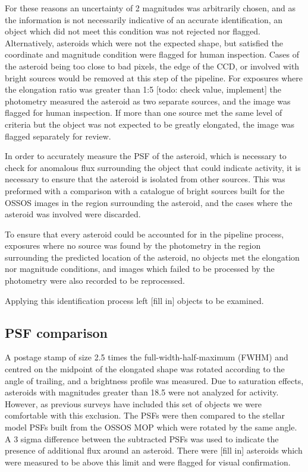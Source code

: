 \documentclass[iop,apj]{emulateapj}
\begin{document}
For these reasons an uncertainty of 2 magnitudes was arbitrarily chosen, and as the information is not necessarily indicative of an accurate identification, an object which did not meet this condition was not rejected nor flagged. Alternatively, asteroids which were not the expected shape, but satisfied the coordinate and magnitude condition were flagged for human inspection. 
Cases of the asteroid being too close to bad pixels, the edge of the CCD, or involved with bright sources would be removed at this step of the pipeline. For exposures where the elongation ratio was greater than 1:5 [todo: check value, implement] the photometry measured the asteroid as two separate sources, and the image was flagged for human inspection. If more than one source met the same level of criteria but the object was not expected to be greatly elongated, the image was flagged separately for review.

In order to accurately measure the PSF of the asteroid, which is necessary to check for anomalous flux surrounding the object that could indicate activity, it is necessary to ensure that the asteroid is isolated from other sources. This was preformed with a comparison with a catalogue of bright sources built for the OSSOS images \citep{ossos} in the region surrounding the asteroid, and the cases where the asteroid was involved were discarded.

To ensure that every asteroid could be accounted for in the pipeline process, exposures where no source was found by the photometry in the region surrounding the predicted location of the asteroid, no objects met the elongation nor magnitude conditions, and images which failed to be processed by the photometry were also recorded to be reprocessed.

Applying this identification process left [fill in] objects to be examined.


\subsection{PSF comparison}

A postage stamp of size 2.5 times the full-width-half-maximum (FWHM) and centred on the midpoint of the elongated shape was rotated according to the angle of trailing, and a brightness profile was measured. Due to saturation effects, asteroids with magnitudes greater than 18.5 were not analyzed for activity. However, as previous surveys have included this set of objects \citep{hsieh15} we were comfortable with this exclusion. The PSFs were then compared to the stellar model PSFs built from the OSSOS MOP \citep{ossos} which were rotated by the same angle. A 3 sigma difference between the subtracted PSFs was used to indicate the presence of additional flux around an asteroid. There were [fill in] asteroids which were measured to be above this limit and were flagged for visual confirmation. 
\end{document}
